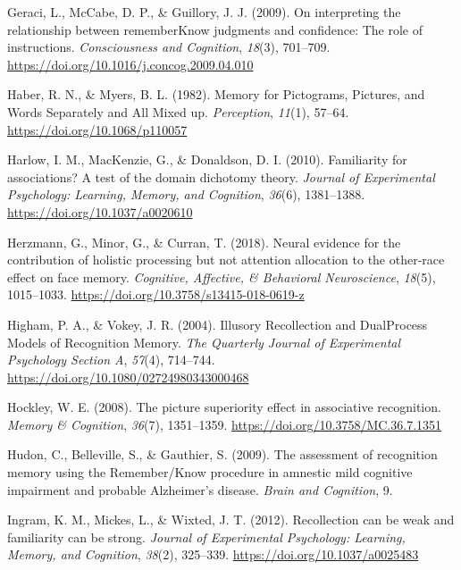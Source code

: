 \documentclass[
  11pt,
]{article}
\begin{document}
\leavevmode\hypertarget{ref-geraci2009a}{}%
Geraci, L., McCabe, D. P., \& Guillory, J. J. (2009). On interpreting
the relationship between rememberKnow judgments and confidence: The role
of instructions. \emph{Consciousness and Cognition}, \emph{18}(3),
701--709. \url{https://doi.org/10.1016/j.concog.2009.04.010}

\leavevmode\hypertarget{ref-haber1982}{}%
Haber, R. N., \& Myers, B. L. (1982). Memory for Pictograms, Pictures,
and Words Separately and All Mixed up. \emph{Perception}, \emph{11}(1),
57--64. \url{https://doi.org/10.1068/p110057}

\leavevmode\hypertarget{ref-harlow2010}{}%
Harlow, I. M., MacKenzie, G., \& Donaldson, D. I. (2010). Familiarity
for associations? A test of the domain dichotomy theory. \emph{Journal
of Experimental Psychology: Learning, Memory, and Cognition},
\emph{36}(6), 1381--1388. \url{https://doi.org/10.1037/a0020610}

\leavevmode\hypertarget{ref-herzmann2018}{}%
Herzmann, G., Minor, G., \& Curran, T. (2018). Neural evidence for the
contribution of holistic processing but not attention allocation to the
other-race effect on face memory. \emph{Cognitive, Affective, \&
Behavioral Neuroscience}, \emph{18}(5), 1015--1033.
\url{https://doi.org/10.3758/s13415-018-0619-z}

\leavevmode\hypertarget{ref-higham2004}{}%
Higham, P. A., \& Vokey, J. R. (2004). Illusory Recollection and
DualProcess Models of Recognition Memory. \emph{The Quarterly Journal of
Experimental Psychology Section A}, \emph{57}(4), 714--744.
\url{https://doi.org/10.1080/02724980343000468}

\leavevmode\hypertarget{ref-hockley2008}{}%
Hockley, W. E. (2008). The picture superiority effect in associative
recognition. \emph{Memory \& Cognition}, \emph{36}(7), 1351--1359.
\url{https://doi.org/10.3758/MC.36.7.1351}

\leavevmode\hypertarget{ref-hudon2009}{}%
Hudon, C., Belleville, S., \& Gauthier, S. (2009). The assessment of
recognition memory using the Remember/Know procedure in amnestic mild
cognitive impairment and probable Alzheimer's disease. \emph{Brain and
Cognition}, 9.

\leavevmode\hypertarget{ref-ingram2012}{}%
Ingram, K. M., Mickes, L., \& Wixted, J. T. (2012). Recollection can be
weak and familiarity can be strong. \emph{Journal of Experimental
Psychology: Learning, Memory, and Cognition}, \emph{38}(2), 325--339.
\url{https://doi.org/10.1037/a0025483}
\end{document}
